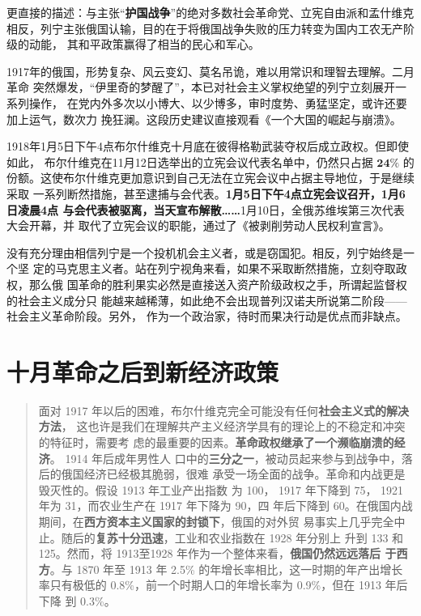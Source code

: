 更直接的描述：与主张“\textbf{护国战争}”的绝对多数社会革命党、立宪自由派和孟什维克
相反，列宁主张俄国认输，目的在于将俄国战争失败的压力转变为国内工农无产阶级的动能，
其和平政策赢得了相当的民心和军心。

1917年的俄国，形势复杂、风云变幻、莫名吊诡，难以用常识和理智去理解。二月革命
突然爆发，“伊里奇的梦醒了”，本已对社会主义掌权绝望的列宁立刻展开一系列操作，
在党内外多次以小博大、以少博多，审时度势、勇猛坚定，或许还要加上运气，数次力
挽狂澜。这段历史建议直接观看《一个大国的崛起与崩溃》。

1918年1月5日下午4点布尔什维克十月底在彼得格勒武装夺权后成立政权。但即使如此，
布尔什维克在11月12日选举出的立宪会议代表名单中，仍然只占据 $\mathbf{24\%}$ 的
份额。这使布尔什维克更加意识到自己无法在立宪会议中占据主导地位，于是继续采取
一系列断然措施，甚至逮捕与会代表。\textbf{1月5日下午4点立宪会议召开，1月6日凌晨4点
  与会代表被驱离，当天宣布解散……}1月10日，全俄苏维埃第三次代表大会开幕，并
取代了立宪会议的职能，通过了《被剥削劳动人民权利宣言》。

没有充分理由相信列宁是一个投机机会主义者，或是窃国犯。相反，列宁始终是一个坚
定的马克思主义者。站在列宁视角来看，如果不采取断然措施，立刻夺取政权，那么俄
国革命的胜利果实必然是直接送入资产阶级政权之手，所谓起监督权的社会主义成分只
能越来越稀薄，如此绝不会出现普列汉诺夫所说第二阶段——社会主义革命阶段。另外，
作为一个政治家，待时而果决行动是优点而非缺点。

\section{十月革命之后到新经济政策}

\begin{quotation}
  面对 1917 年以后的困难，布尔什维克完全可能没有任何\textbf{社会主义式的解决方法}，
  这也许是我们在理解共产主义经济学具有的理论上的不稳定和冲突的特征时，需要考
  虑的最重要的因素。\textbf{革命政权继承了一个濒临崩溃的经济}。 1914 年后成年男性人
  口中的\textbf{三分之一}，被动员起来参与到战争中，落后的俄国经济已经极其脆弱，很难
  承受一场全面的战争。革命和内战更是毁灭性的。假设 1913 年工业产出指数
  为 100， 1917 年下降到 75， 1921 年为 31，而农业生产在 1917 年下降为 90，四
  年后下降到 60。在俄国内战期间，在\textbf{西方资本主义国家的封锁下}，俄国的对外贸
  易事实上几乎完全中止。随后的\textbf{复苏十分迅速}，工业和农业指数在 1928 年分别上
  升到 133 和 125。然而，将 1913至1928 年作为一个整体来看，\textbf{俄国仍然远远落后
    于西方}。与 1870 年至 1913 年 2.5\% 的年增长率相比，这一时期的年产出增长
  率只有极低的 0.8\%，前一个时期人口的年增长率为 0.9\%，但在 1913 年后下降
  到 0.3\%。

\end{quotation}

